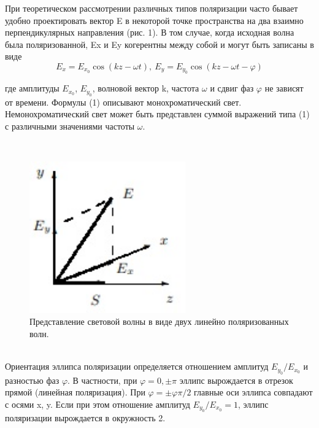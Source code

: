 \documentclass[a4paper, 12pt, twoside]{article}
\begin{document}
	\begin{minipage}{0.6 \linewidth}
		При теоретическом рассмотрении различных типов поляризации часто бывает удобно проектировать вектор E в некоторой точке пространства на два взаимно перпендикулярных направления (рис. 1). В том случае, когда исходная волна была поляризованной, Ex и Ey когерентны между собой и могут быть записаны в виде
		\begin{equation}
		E_x = E_{x_0} \cos (kz - \omega t),
		~
		E_y = E_{y_0} \cos (kz - \omega t - \varphi)
		\end{equation}
		
		где амплитуды $E_{x_0}$, $E_{y_0}$, волновой вектор k, частота $\omega$ и сдвиг фаз $\varphi$ не зависят от времени. Формулы (1) описывают монохроматический свет. Немонохроматический свет может быть представлен суммой выражений типа (1) с различными значениями частоты $\omega$. 
	\end{minipage}
	~
	\begin{minipage}{0.39\linewidth}
		\begin{figure}[H]
			\centering
			\includegraphics[width =  0.6\textwidth]{ris1}
			\caption{Представление световой волны в виде двух линейно поляризованных волн.}
			\label{ris1}
		\end{figure}
	\end{minipage}\\
	
	
	Ориентация эллипса поляризации определяется отношением амплитуд $E_{y_0}/E_{x_0}$ и разностью фаз $\varphi$. В частности, при $\varphi = 0, \pm \pi$ эллипс вырождается в отрезок прямой (линейная поляризация). При $\varphi = \pm \varphi \pi/2$ главные оси эллипса совпадают с осями x, y. Если при этом отношение амплитуд $E_{y_0}/E_{x_0} = 1$, эллипс поляризации вырождается в окружность 2.
	
\end{document}
